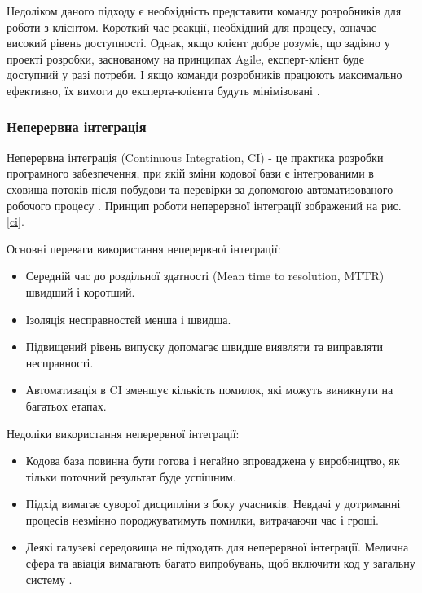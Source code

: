 Недоліком даного підходу є необхідність представити команду розробників для роботи з клієнтом.
Короткий час реакції, необхідний для процесу, означає високий рівень доступності.
Однак, якщо клієнт добре розуміє, що задіяно у проекті розробки,
заснованому на принципах Agile, експерт-клієнт буде доступний у разі потреби.
І якщо команди розробників працюють максимально ефективно,
їх вимоги до експерта-клієнта будуть мінімізовані \cite{bdd-article-2}.

\subsubsection{Неперервна інтеграція}
Неперервна інтеграція (Continuous Integration, CI)
- це практика розробки програмного забезпечення,
при якій зміни кодової бази є інтегрованими в сховища потоків після
побудови та перевірки за допомогою автоматизованого робочого процесу \cite{ci-book}.
Принцип роботи неперервної інтеграції зображений на рис. \ref{ci}.

Основні переваги використання неперервної інтеграції:

\begin{itemize}
		\item Середній час до роздільної здатності 
			(Mean time to resolution, MTTR) швидший і коротший.
		\item Ізоляція несправностей менша і швидша.
		\item Підвищений рівень випуску допомагає швидше виявляти
			та виправляти несправності.
		\item Автоматизація в CI зменшує кількість помилок,
			які можуть виникнути на багатьох етапах.
\end{itemize}

Недоліки використання неперервної інтеграції:

\begin{itemize}
		\item Кодова база повинна бути готова і негайно впроваджена у виробництво,
			як тільки поточний результат буде успішним.
		\item Підхід вимагає суворої дисципліни з боку учасників.
			Невдачі у дотриманні процесів незмінно породжуватимуть помилки,
			витрачаючи час і гроші.
		\item Деякі галузеві середовища не підходять для неперервної інтеграції.
			Медична сфера та авіація вимагають багато випробувань,
			щоб включити код у загальну систему \cite{ci-article}.
\end{itemize}

